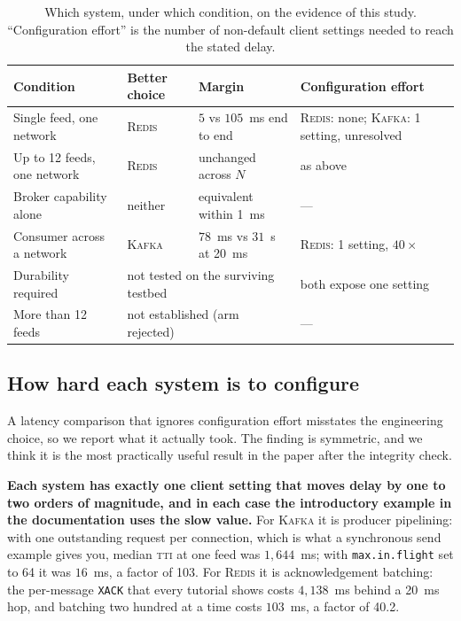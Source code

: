 \documentclass[Afour,sageh,times]{sagej}
\newcommand{\redis}{\textsc{Redis}}
\newcommand{\kafka}{\textsc{Kafka}}
\newcommand{\tti}{\textsc{tti}}
\begin{document}
\begin{table}[htbp]
\centering
\caption{Which system, under which condition, on the evidence of this study. ``Configuration
effort'' is the number of non-default client settings needed to reach the stated delay.}
\label{tab:decision}
\begin{tabular}{llll}
\toprule
Condition & Better choice & Margin & Configuration effort \\
\midrule
Single feed, one network      & \redis{} & $5$ vs $105$~ms end to end & \redis{}: none;
\kafka{}: 1 setting, unresolved \\
Up to 12 feeds, one network   & \redis{} & unchanged across $N$   & as above \\
Broker capability alone       & neither  & equivalent within 1~ms & --- \\
Consumer across a network     & \kafka{} & $78$~ms vs $31$~s at 20~ms & \redis{}: 1 setting,
$40\times$ \\
Durability required           & \multicolumn{2}{l}{not tested on the surviving testbed} & both
expose one setting \\
More than 12 feeds            & \multicolumn{2}{l}{not established (arm rejected)} & --- \\
\bottomrule
\end{tabular}
\end{table}

\subsection{How hard each system is to configure}
\label{sec:config}

A latency comparison that ignores configuration effort misstates the engineering choice, so we
report what it actually took. The finding is symmetric, and we think it is the most practically
useful result in the paper after the integrity check.

\textbf{Each system has exactly one client setting that moves delay by one to two orders of
magnitude, and in each case the introductory example in the documentation uses the slow value.}
For \kafka{} it is producer pipelining: with one outstanding request per connection, which is what
a synchronous send example gives you, median \tti{} at one feed was $1{,}644$~ms; with
\texttt{max.in.flight} set to 64 it was $16$~ms, a factor of 103. For \redis{} it is
acknowledgement batching: the per-message \texttt{XACK} that every tutorial shows costs
$4{,}138$~ms behind a 20~ms hop, and batching two hundred at a time costs $103$~ms, a factor of
40.2.
\end{document}
